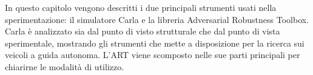 In questo capitolo vengono descritti i due principali strumenti usati nella sperimentazione: il simulatore Carla e la libreria Adversarial Robustness Toolbox.
Carla  è analizzato sia dal punto di visto strutturale che dal punto di vista sperimentale, mostrando gli strumenti che mette a disposizione per la ricerca sui veicoli a
guida autonoma. L'ART viene scomposto nelle sue parti principali per chiarirne le modalità di utilizzo.



